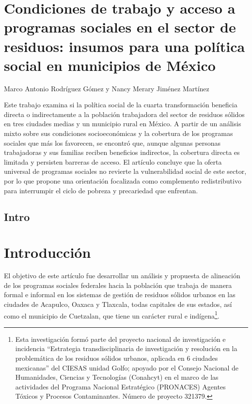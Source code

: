 \documentclass[
  spanish,
  11.5pt,
  170mm x 240mmpaper,
]{scrbook}
\begin{document}
\chapter{Condiciones de trabajo y acceso a programas sociales en el
sector de residuos: insumos para una política social en municipios de
México}\label{condiciones-de-trabajo-y-acceso-a-programas-sociales-en-el-sector-de-residuos-insumos-para-una-poluxedtica-social-en-municipios-de-muxe9xico}

Marco Antonio Rodríguez Gómez y Nancy Merary Jiménez Martínez

Este trabajo examina si la política social de la cuarta transformación
beneficia directa o indirectamente a la población trabajadora del sector
de residuos sólidos en tres ciudades medias y un municipio rural en
México. A partir de un análisis mixto sobre sus condiciones
socioeconómicas y la cobertura de los programas sociales que más los
favorecen, se encontró que, aunque algunas personas trabajadoras y sus
familias reciben beneficios indirectos, la cobertura directa es limitada
y persisten barreras de acceso. El artículo concluye que la oferta
universal de programas sociales no revierte la vulnerabilidad social de
este sector, por lo que propone una orientación focalizada como
complemento redistributivo para interrumpir el ciclo de pobreza y
precariedad que enfrentan.

\hfill\break

\section*{Intro}\label{intro-1}




\chapter{Introducción}\label{introducciuxf3n-1}

El objetivo de este artículo fue desarrollar un análisis y propuesta de
alineación de los programas sociales federales hacia la población que
trabaja de manera formal e informal en los sistemas de gestión de
residuos sólidos urbanos en las ciudades de Acapulco, Oaxaca y Tlaxcala,
todas capitales de sus estados, así como el municipio de Cuetzalan, que
tiene un carácter rural e indígena\footnote{Esta investigación formó
  parte del proyecto nacional de investigación e incidencia ``Estrategia
  transdisciplinaria de investigación y resolución en la problemática de
  los residuos sólidos urbanos, aplicada en 6 ciudades mexicanas'' del
  CIESAS unidad Golfo; apoyado por el Consejo Nacional de Humanidades,
  Ciencias y Tecnologías (Conahcyt) en el marco de las actividades del
  Programa Nacional Estratégico (PRONACES) Agentes Tóxicos y Procesos
  Contaminantes. Número de proyecto 321379.}.
\end{document}
